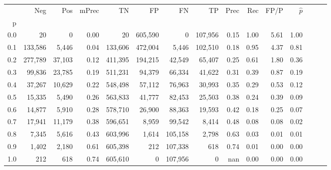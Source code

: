 \begin{tabular}{rrrrrrrrrrrrrrr}
\toprule
{} &      Neg &     Pos & mPrec &       TN &       FP &       FN &       TP &  Prec &   Rec &  FP/P & $\hat{p}$ \\
p   &          &         &       &          &          &          &          &       &       &       &           \\
\midrule
0.0 &       20 &       0 &  0.00 &       20 &  605,590 &        0 &  107,956 &  0.15 &  1.00 &  5.61 &      1.00 \\
0.1 &  133,586 &   5,446 &  0.04 &  133,606 &  472,004 &    5,446 &  102,510 &  0.18 &  0.95 &  4.37 &      0.81 \\
0.2 &  277,789 &  37,103 &  0.12 &  411,395 &  194,215 &   42,549 &   65,407 &  0.25 &  0.61 &  1.80 &      0.36 \\
0.3 &   99,836 &  23,785 &  0.19 &  511,231 &   94,379 &   66,334 &   41,622 &  0.31 &  0.39 &  0.87 &      0.19 \\
0.4 &   37,267 &  10,629 &  0.22 &  548,498 &   57,112 &   76,963 &   30,993 &  0.35 &  0.29 &  0.53 &      0.12 \\
0.5 &   15,335 &   5,490 &  0.26 &  563,833 &   41,777 &   82,453 &   25,503 &  0.38 &  0.24 &  0.39 &      0.09 \\
0.6 &   14,877 &   5,910 &  0.28 &  578,710 &   26,900 &   88,363 &   19,593 &  0.42 &  0.18 &  0.25 &      0.07 \\
0.7 &   17,941 &  11,179 &  0.38 &  596,651 &    8,959 &   99,542 &    8,414 &  0.48 &  0.08 &  0.08 &      0.02 \\
0.8 &    7,345 &   5,616 &  0.43 &  603,996 &    1,614 &  105,158 &    2,798 &  0.63 &  0.03 &  0.01 &      0.01 \\
0.9 &    1,402 &   2,180 &  0.61 &  605,398 &      212 &  107,338 &      618 &  0.74 &  0.01 &  0.00 &      0.00 \\
1.0 &      212 &     618 &  0.74 &  605,610 &        0 &  107,956 &        0 &   nan &  0.00 &  0.00 &      0.00 \\
\bottomrule
\end{tabular}
